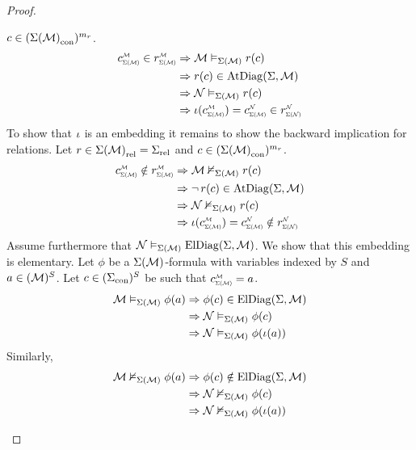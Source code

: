 \begin{proof}
\begin{forward}
        $c \in ({\Sigma(\mathcal{M})}_\mathrm{con})^{m_r}$.
        \begin{align*}
            \subintp{\Si(\MM)}{\MM}{c}\in \subintp{\Si(\MM)}{\MM}{r} 
            &\implies \MM \model{\Si(\MM)} r(c)\\
            &\implies r(c) \in \atdiag{\Si}{\MM}\\
            &\implies \NN \model{\Si(\MM)} r(c) \\
            &\implies \io(\subintp{\Si(\MM)}{\MM}{c}) = 
            \subintp{\Si(\MM)}{\NN}{c} \in \subintp{\Si(\NN)}{\NN}{r} 
        \end{align*}
        To show that $\iota$ is an embedding it remains to show 
        the backward implication for relations.
        Let $r \in {\Sigma(\mathcal{M})}_\mathrm{rel} = {\Sigma}_\mathrm{rel}$ and 
        $c \in ({\Sigma(\mathcal{M})}_\mathrm{con})^{m_r}$.
        \begin{align*}
            \subintp{\Si(\MM)}{\MM}{c} \notin \subintp{\Si(\MM)}{\MM}{r} 
            &\implies \MM \nodel{\Si(\MM)} r(c)\\
            &\implies \NOT r(c) \in \atdiag{\Si}{\MM}\\
            &\implies \NN \nodel{\Si(\MM)} r(c) \\
            &\implies \io(\subintp{\Si(\MM)}{\MM}{c}) = 
            \subintp{\Si(\MM)}{\NN}{c} \notin \subintp{\Si(\NN)}{\NN}{r} 
        \end{align*}
        Assume furthermore that $\mathcal{N} \vDash_{\Sigma(\mathcal{M})} \mathrm{ElDiag}(\Sigma,\mathcal{M})$.
        We show that this embedding is elementary.
        Let $\phi$ be a $\Sigma(\mathcal{M})$-formula
        with variables indexed by $S$
        and $a \in ({\mathcal{M}})^S$.
        Let $c \in ({\Sigma}_\mathrm{con})^S$ be such that 
        $\subintp{\Si(\MM)}{\MM}{c} = a$.
        \begin{align*}
            \mathcal{M} \vDash_{\Sigma(\mathcal{M})} \phi(a) 
                &\Rightarrow \phi(c) \in \mathrm{ElDiag}(\Sigma,\mathcal{M})\\
                &\Rightarrow \mathcal{N} \vDash_{\Sigma(\mathcal{M})} \phi(c)\\
                &\Rightarrow \mathcal{N} \vDash_{\Sigma(\mathcal{M})} \phi(\iota(a))
        \end{align*}
        Similarly,
        \begin{align*}
            \mathcal{M} \nvDash_{\Sigma(\mathcal{M})} \phi(a) &\Rightarrow \phi(c) 
                \notin \mathrm{ElDiag}(\Sigma,\mathcal{M})\\
            &\Rightarrow \mathcal{N} \nvDash_{\Sigma(\mathcal{M})} \phi(c)\\
            &\Rightarrow \mathcal{N} \nvDash_{\Sigma(\mathcal{M})} \phi(\iota(a))
        \end{align*}

\end{forward}
\end{proof}
